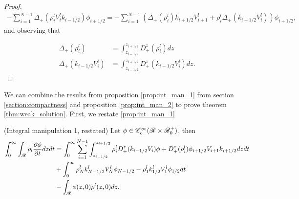 \begin{proof}
\begin{align}
	- \sum_{i = 1}^{N-1} \Delta_+\left(\rho^l_i V^l_i k_{i-1/2}\right) \phi_{i+1/2} = - \sum_{i = 1}^{N-1} \left(\Delta_+\left(\rho^l_i\right) k_{i+1/2} V^l_{i+1}   +\rho^l_i\Delta_+\left( k_{i-1/2} V^l_i \right) \right) \phi_{i+1/2}, 
\end{align}
and observing that 


\begin{align}
	\Delta_+\left(\rho^l_i\right) &= \int_{z_{i-1/2}}^{z_{i+1/2}} D_+^z\left(\rho^l_i\right)dz \\
	\Delta_+\left( k_{i-1/2} V^l_i\right) &= \int_{z_{i-1/2}}^{z_{i+1/2}} D_+^z\left( k_{i-1/2} V^l_i\right)dz.
\end{align}
\end{proof}


We can combine the results from proposition \eqref{prop:int_man_1} from section \eqref{section:compactness} and proposition \eqref{prop:int_man_2} to prove theorem \eqref{thm:weak_solution}. First, we restate \eqref{prop:int_man_1}

\begin{proposition}(Integral manipulation 1, restated) \label{prop:int_man_1_restated}
Let $\phi \in \mathscr{C}^\infty_c(\mathscr{R} \times \mathscr{R}^+_0)$, then  
\begin{align}
	\int_0^{\infty} \int_{\mathscr{R}}\rho_l \frac{\partial \phi}{\partial t} dz dt &= \int_0^{\infty} \sum_{i = 1}^{N-1} \int_{z_{i-1/2}}^{z_{i+1/2}} \rho^l_i D_+^z(k_{i-1/2} V_i
	) \phi + D^z_+(\rho^l_i) \phi_{i+1/2}V_{i+1}k_{i+1/2} dzdt \label{lemma:int_man_1_restate:sum_term} \\ \quad &+ \int_0^{\infty} \rho^l_N k^l_{N-1/2} V^l_N  \phi_{N-1/2} - \rho^l_1 k^l_{1/2} V^l_1 \phi_{1/2} dt \label{lemma:int_man_1_restate:bdry_term}\\
	&- \int_{\mathscr{R}} \phi(z,0) \rho^l(z,0) dz. \label{lemma:int_man_1_restate:init_cond}
\end{align}
\end{proposition}

